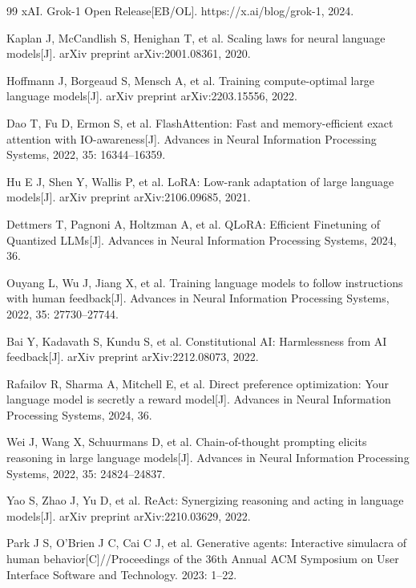 \begin{thebibliography}{99}
 xAI. Grok-1 Open Release[EB/OL]. https://x.ai/blog/grok-1, 2024.

 Kaplan J, McCandlish S, Henighan T, et al. Scaling laws for neural language models[J]. arXiv preprint arXiv:2001.08361, 2020.

 Hoffmann J, Borgeaud S, Mensch A, et al. Training compute-optimal large language models[J]. arXiv preprint arXiv:2203.15556, 2022.

 Dao T, Fu D, Ermon S, et al. FlashAttention: Fast and memory-efficient exact attention with IO-awareness[J]. Advances in Neural Information Processing Systems, 2022, 35: 16344--16359.

 Hu E J, Shen Y, Wallis P, et al. LoRA: Low-rank adaptation of large language models[J]. arXiv preprint arXiv:2106.09685, 2021.

 Dettmers T, Pagnoni A, Holtzman A, et al. QLoRA: Efficient Finetuning of Quantized LLMs[J]. Advances in Neural Information Processing Systems, 2024, 36.

 Ouyang L, Wu J, Jiang X, et al. Training language models to follow instructions with human feedback[J]. Advances in Neural Information Processing Systems, 2022, 35: 27730--27744.

 Bai Y, Kadavath S, Kundu S, et al. Constitutional AI: Harmlessness from AI feedback[J]. arXiv preprint arXiv:2212.08073, 2022.

 Rafailov R, Sharma A, Mitchell E, et al. Direct preference optimization: Your language model is secretly a reward model[J]. Advances in Neural Information Processing Systems, 2024, 36.

 Wei J, Wang X, Schuurmans D, et al. Chain-of-thought prompting elicits reasoning in large language models[J]. Advances in Neural Information Processing Systems, 2022, 35: 24824--24837.

 Yao S, Zhao J, Yu D, et al. ReAct: Synergizing reasoning and acting in language models[J]. arXiv preprint arXiv:2210.03629, 2022.

 Park J S, O'Brien J C, Cai C J, et al. Generative agents: Interactive simulacra of human behavior[C]//Proceedings of the 36th Annual ACM Symposium on User Interface Software and Technology. 2023: 1--22.


\end{thebibliography}
